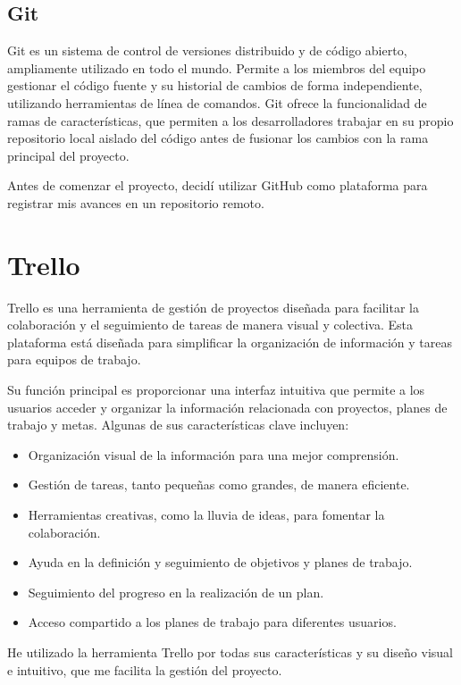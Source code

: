 \subsection{Git}
Git es un sistema de control de versiones distribuido y de código abierto, ampliamente utilizado en todo el mundo. Permite a los miembros del equipo gestionar el código fuente y su historial de cambios de forma independiente, utilizando herramientas de línea de comandos. 
Git ofrece la funcionalidad de ramas de características, que permiten a los desarrolladores trabajar en su propio repositorio local aislado del código antes de fusionar los cambios con la rama principal del proyecto.

Antes de comenzar el proyecto, decidí utilizar GitHub como plataforma para registrar mis avances en un repositorio remoto.

\hfill

\section{Trello}
Trello \cite{trello} es una herramienta de gestión de proyectos diseñada para facilitar la colaboración y el seguimiento de tareas de manera visual y colectiva. Esta plataforma está diseñada para simplificar la organización de información y tareas para equipos de trabajo.

Su función principal es proporcionar una interfaz intuitiva que permite a los usuarios acceder y organizar la información relacionada con proyectos, planes de trabajo y metas. Algunas de sus características clave incluyen:
\begin{itemize}
\tightlist
    \item
        Organización visual de la información para una mejor comprensión.
    \item 
        Gestión de tareas, tanto pequeñas como grandes, de manera eficiente.
    \item 
        Herramientas creativas, como la lluvia de ideas, para fomentar la colaboración.
    \item 
        Ayuda en la definición y seguimiento de objetivos y planes de trabajo.
    \item 
        Seguimiento del progreso en la realización de un plan.
    \item 
        Acceso compartido a los planes de trabajo para diferentes usuarios.
\end{itemize}

He utilizado la herramienta Trello por todas sus características y su diseño visual e intuitivo, que me facilita la gestión del proyecto.

